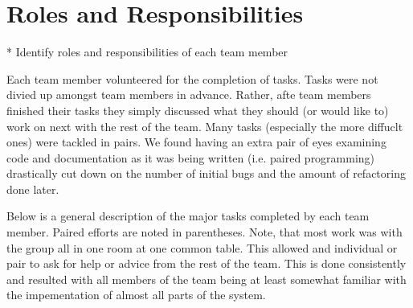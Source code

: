 \section{Roles and Responsibilities}
* Identify roles and responsibilities of each team member

Each team member volunteered for the completion of tasks.  Tasks were not divied up amongst team members in advance.  Rather, afte team members finished their tasks they simply discussed what they should (or would like to) work on next with the rest of the team.  Many tasks (especially the more diffuclt ones) were tackled in pairs.  We found having an extra pair of eyes examining code and documentation as it was being written (i.e. paired programming) drastically cut down on the number of initial bugs and the amount of refactoring done later.

Below is a general description of the major tasks completed by each team member.  Paired efforts are noted in parentheses.  Note, that most work was with the group all in one room at one common table.  This allowed and individual or pair to ask for help or advice from the rest of the team.  This is done consistently and resulted with all members of the team being at least somewhat familiar with the impementation of almost all parts of the system.

